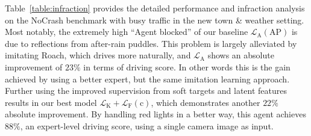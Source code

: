 \hspace{1pc}Table~\ref{table:infraction} provides the detailed performance and infraction analysis on the NoCrash benchmark with busy traffic in the new town \& weather setting.
Most notably, the extremely high ``Agent blocked'' of our baseline $\mathcal{L}_\text{A}(\text{AP})$ is due to reflections from after-rain puddles.
This problem is largely alleviated by imitating Roach, which drives more naturally, and $\mathcal{L}_\text{A}$ shows an absolute improvement of $23\%$ in terms of driving score.
In other words this is the gain achieved by using a better expert, but the same imitation learning approach. 
Further using the improved supervision from soft targets and latent features results in our best model $\mathcal{L}_\text{K}+\mathcal{L}_\text{F}(\text{c})$, which demonstrates another $22\%$ absolute improvement.
By handling red lights in a better way, this agent achieves $88\%$, an expert-level driving score, using a single camera image as input.



 